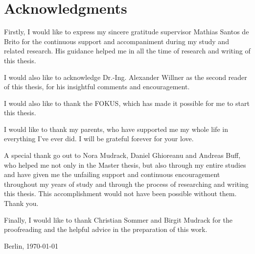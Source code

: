 \chapter*{Acknowledgments}

Firstly, I would like to express my sincere gratitude supervisor Mathias Santos de Brito for the continuous support and accompaniment during my study and related research.
His guidance helped me in all the time of research and writing of this thesis.

I would also like to acknowledge Dr.-Ing. Alexander Willner as the second reader of this thesis, for his insightful comments and encouragement.

I would also like to thank the FOKUS, which has made it possible for me to start this thesis.

I would like to thank my parents, who have supported me my whole life in everything I've ever did.
I will be grateful forever for your love.

A special thank go out to Nora Mudrack, Daniel Ghioreanu and Andreas Buff, who helped me not only in the Master thesis, but also through my entire studies and have given me the unfailing support and continuous encouragement throughout my years of study and through the process of researching and writing this thesis. This accomplishment would not have been possible without them. Thank you.

Finally, I would like to thank Christian Sommer and Birgit Mudrack for the proofreading and the helpful advice in the preparation of this work.

\vspace{0.5in}
\begin{flushright}
  Berlin, \today
\end{flushright}
